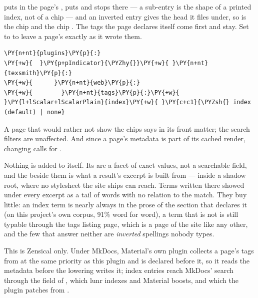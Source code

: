 \documentclass[a4paper,twoside]{article}
\begin{document}
\tscodeinline{\#[pointeur]} puts  in the page's , \tscodeinline{\#[mémoire][allocation]}
puts  and stops there --- a sub-entry is the shape of a printed index,
not of a chip --- and an inverted entry gives the head it files under, so
 is the chip  and  the chip
. The tags the page declares itself come first and stay. Set 
to  to leave a page's  exactly as it wrote them.
\begin{tscode}[lang=yaml, engine=pygments]
\begin{Verbatim}[commandchars=\\\{\},breaklines, breakanywhere, commandchars=\\\{\}]
\PY{n+nt}{plugins}\PY{p}{:}
\PY{+w}{  }\PY{p+pIndicator}{\PYZhy{}}\PY{+w}{ }\PY{n+nt}{texsmith}\PY{p}{:}
\PY{+w}{      }\PY{n+nt}{web}\PY{p}{:}
\PY{+w}{        }\PY{n+nt}{tags}\PY{p}{:}\PY{+w}{ }\PY{l+lScalar+lScalarPlain}{index}\PY{+w}{ }\PY{c+c1}{\PYZsh{} index (default) | none}
\end{Verbatim}
\end{tscode}
A page that would rather not show the chips says  in its front
matter; the search filters are unaffected. And since a page's metadata is part
of its cached render, changing  calls for .

Nothing is added to  itself. Its  are a facet of exact
values, not a searchable field, and the  beside them is what a result's
excerpt is built from --- inside a shadow root, where no stylesheet the site
ships can reach. Terms written there showed under every excerpt as a tail of
words with no relation to the match. They buy little: an index term is nearly
always in the prose of the section that declares it (on this project's own
corpus, 91\% word for word), a term that is not is still typable through the
tags listing page, which is a page of the site like any other, and the few
that answer neither are \emph{inverted} spellings nobody types.

This is Zensical only. Under MkDocs, Material's own  plugin collects a
page's tags from  at the same priority as this plugin and is
declared before it, so it reads the metadata before the lowering writes it;
index entries reach MkDocs' search through the  field of
, which lunr indexes and Material boosts, and which the
plugin patches from .
\end{document}
